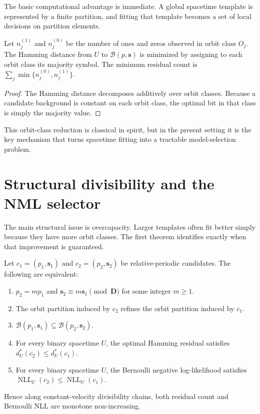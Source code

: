 \documentclass[10pt,twoside]{article}
\newcommand{\bs}{\mathbf{s}}
\newcommand{\bD}{\mathbf{D}}
\newcommand{\NLL}{\operatorname{NLL}}
\begin{document}
The basic computational advantage is immediate. A global spacetime template is represented by a finite partition, and fitting that template becomes a set of local decisions on partition elements.

\begin{lemma}
Let $n_j^{(1)}$ and $n_j^{(0)}$ be the number of ones and zeros observed in orbit class $O_j$. The Hamming distance from $U$ to $\mathcal{B}(p,\bs)$ is minimized by assigning to each orbit class its majority symbol. The minimum residual count is $\sum_j \min\{n_j^{(0)},n_j^{(1)}\}$.
\end{lemma}

\begin{proof}
The Hamming distance decomposes additively over orbit classes. Because a candidate background is constant on each orbit class, the optimal bit in that class is simply the majority value.
\end{proof}

This orbit-class reduction is classical in spirit, but in the present setting it is the key mechanism that turns spacetime fitting into a tractable model-selection problem.

\section{Structural divisibility and the NML selector}

The main structural issue is overcapacity. Larger templates often fit better simply because they have more orbit classes. The first theorem identifies exactly when that improvement is guaranteed.

\begin{theorem}\label{thm:div}
Let $c_1=(p_1,\bs_1)$ and $c_2=(p_2,\bs_2)$ be relative-periodic candidates. The following are equivalent:
\begin{enumerate}
\item[(i)] $p_2 = m p_1$ and $\bs_2 \equiv m\bs_1 \pmod{\bD}$ for some integer $m\ge 1$.
\item[(ii)] The orbit partition induced by $c_2$ refines the orbit partition induced by $c_1$.
\item[(iii)] $\mathcal{B}(p_1,\bs_1) \subseteq \mathcal{B}(p_2,\bs_2)$.
\item[(iv)] For every binary spacetime $U$, the optimal Hamming residual satisfies $d_U^*(c_2) \le d_U^*(c_1)$.
\item[(v)] For every binary spacetime $U$, the Bernoulli negative log-likelihood satisfies $\NLL_U(c_2) \le \NLL_U(c_1)$.
\end{enumerate}
Hence along constant-velocity divisibility chains, both residual count and Bernoulli NLL are monotone non-increasing.
\end{theorem}
\end{document}
